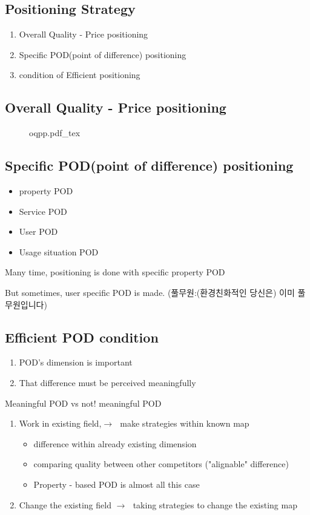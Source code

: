 \documentclass[12pt]{article}
\newcommand{\ra}{$\rightarrow \text{ }$}
\begin{document}
\subsection{Positioning Strategy}
\begin{enumerate}
	\item Overall Quality - Price positioning
	\item Specific POD(point of difference) positioning
	\item condition of Efficient positioning
\end{enumerate}
\subsection{Overall Quality - Price positioning}
\begin{figure}[H]
	\centering
	\def\svgwidth{\columnwidth}
	{oqpp.pdf_tex}
	\caption{}
	\label{fig:oqpp}
\end{figure}
\subsection{Specific POD(point of difference) positioning}
\begin{itemize}
	\item property POD
	\item Service POD
	\item User POD
	\item Usage situation POD
\end{itemize}
{\large Many time, positioning is done with specific property POD}

But sometimes, user specific POD is made.
(풀무원:(환경친화적인 당신은) 이미 풀무원입니다)

\subsection{Efficient POD condition}
\begin{enumerate}
	\item POD's dimension is important
	\item That difference must be perceived meaningfully
\end{enumerate}

\begin{center}
	Meaningful POD vs not! meaningful POD

\end{center}
\begin{enumerate}
	\item Work in existing field,\ra make strategies within known map
	\begin{itemize}
		\item difference within already existing dimension
		\item comparing quality between other competitors ("alignable" difference)
		\item Property - based POD is almost all this case
	\end{itemize}
	\item Change the existing field \ra taking strategies to change the existing map
\end{enumerate}
\end{document}
